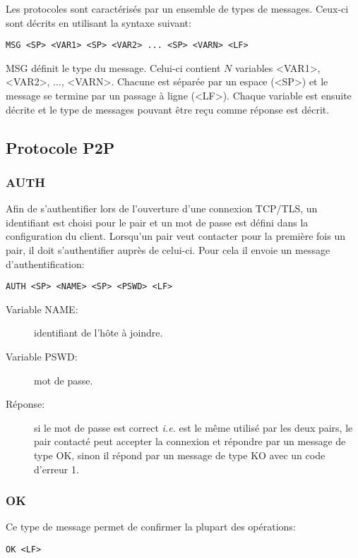 Les protocoles sont caractérisés par un ensemble de types de messages.
Ceux-ci sont décrits en utilisant la syntaxe suivant:
\begin{verbatim}
MSG <SP> <VAR1> <SP> <VAR2> ... <SP> <VARN> <LF>
\end{verbatim}
MSG définit le type du message. Celui-ci contient $N$ variables
<VAR1>, <VAR2>, $\ldots$, <VARN>. Chacune est séparée par un espace (<SP>)
et le message se termine par un passage à ligne (<LF>). Chaque variable est
ensuite décrite et le type de messages pouvant être reçu comme réponse est
décrit.

\subsection{Protocole P2P}
\subsubsection*{AUTH}
Afin de s'authentifier lors de l'ouverture d'une connexion TCP/TLS,
un identifiant est choisi pour le pair et un mot de passe est défini dans la
configuration du client.
Lorsqu'un pair veut contacter pour la première fois un pair, il doit
s'authentifier auprès de celui-ci. Pour cela il envoie un message
d'authentification:
\begin{verbatim}
AUTH <SP> <NAME> <SP> <PSWD> <LF>
\end{verbatim}
\begin{description}
\item[Variable NAME:] identifiant de l'hôte à joindre.
\item[Variable PSWD:] mot de passe.
\item[Réponse:] si le mot de passe est correct \emph{i.e.} est le même
  utilisé par les deux pairs, le pair contacté peut accepter la connexion
  et répondre par un message de type OK, sinon il répond par un message de type
  KO avec un code d'erreur 1.
\end{description}

\subsubsection*{OK}
Ce type de message permet de confirmer la plupart des opérations:
\begin{verbatim}
OK <LF>
\end{verbatim}

